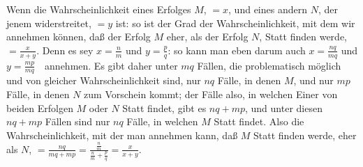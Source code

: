 \begin{aufza}
\begin{aufzb}
\item Wenn die Wahrscheinlichkeit eines Erfolges $M$, $= x$, und eines andern $N$, der jenem widerstreitet, $= y$ ist: so ist der Grad der Wahrscheinlichkeit, mit dem wir annehmen können, daß der Erfolg $M$ eher, als der Erfolg $N$, Statt finden werde, $= \frac{x}{x+y}$. Denn es sey $x = \frac{n}{m}$ und $y = \frac{p}{q}$: so kann man eben darum auch $x = \frac{nq}{mq}$  und $y = \frac{mp}{mq}$~\ annehmen. Es gibt daher unter $mq$ Fällen, die problematisch möglich und von gleicher Wahrscheinlichkeit sind, nur $nq$ Fälle, in denen $M$, und nur $mp$ Fälle, in denen $N$ zum Vorschein kommt; der Fälle also, in welchen Einer von beiden Erfolgen $M$ oder $N$ Statt findet, gibt es $nq + mp$, und unter diesen $nq + mp$ Fällen sind nur $nq$ Fälle, in welchen $M$ Statt findet. Also die Wahrscheinlichkeit, mit der man annehmen kann, daß $M$ Statt finden werde, eher als $N$, $= \frac{nq}{mq+mp} =  \frac{\frac{n}{m}}{\frac{n}{m}+\frac{p}{q}} = \frac{x}{x+y}$.
\end{aufzb}
\end{aufza}

